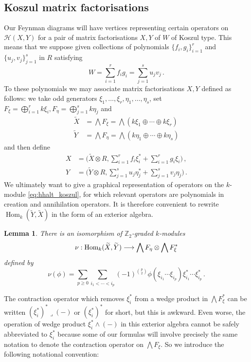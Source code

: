 \documentclass[english,letter paper,12pt,leqno]{article}
\newtheorem{lemma}[theorem]{Lemma}
\theoremstyle{example}
\numberwithin{equation}{section}
\def\HH{\HH}
\def\HH{\mathcal{H}}
\def\Hom{\operatorname{Hom}}
\def\nZ{\mathds{Z}}
\begin{document}
\subsection{Koszul matrix factorisations}\label{section:koszul_mf}

Our Feynman diagrams will have vertices representing certain operators on $\HH(X,Y)$ for a pair of matrix factorisations $X,Y$ of $W$ of Koszul type. This means that we suppose given collections of polynomials $\{ f_i, g_i \}_{i=1}^r$ and $\{ u_j, v_j \}_{j=1}^s$ in $R$ satisfying
\[
W = \sum_{i=1}^r f_i g_i = \sum_{j=1}^s u_j v_j\,.
\]
To these polynomials we may associate matrix factorisations $X,Y$ defined as follows: we take odd generators $\xi_1,\ldots,\xi_r,\eta_1,\ldots,\eta_s$, set $F_\xi = \bigoplus_{i=1}^r k \xi_i, F_\eta = \bigoplus_{j=1}^s k \eta_j$ and
\begin{align*}
\widetilde{X} &= \bigwedge F_\xi = \bigwedge( k \xi_1 \oplus \cdots \oplus k \xi_r )\\
\widetilde{Y} &= \bigwedge F_\eta = \bigwedge( k \eta_1 \oplus \cdots \oplus k \eta_s )
\end{align*}
and then define
\begin{align}
X &= \big( \widetilde{X} \otimes R, \sum_{i=1}^r f_i \xi_i^* + \sum_{i=1}^r g_i \xi_i \big)\,,\label{eq:defn_X_tilde}\\
Y &= \big( \widetilde{Y} \otimes R, \sum_{j=1}^s u_j \eta_j^* + \sum_{j=1}^s v_j \eta_j \big)\,.\label{eq:defn_Y_tilde}
\end{align}
We ultimately want to give a graphical representation of operators on the $k$-module \eqref{eq:hhalt_koszul}, for which relevant operators are polynomials in creation and annihilation operators. It is therefore convenient to rewrite $\Hom_k( \widetilde{Y}, \widetilde{X} )$ in the form of an exterior algebra.

\begin{lemma}\label{lemma:iso_nu} There is an isomorphism of $\nZ_2$-graded $k$-modules
\[
\nu: \Hom_k( \widetilde{X}, \widetilde{Y} ) \lto \bigwedge F_\eta \otimes \bigwedge F_\xi^* 
\]
defined by
\[
\nu( \phi ) = \sum_{p \ge 0} \sum_{i_1 < \cdots < i_p} (-1)^{\binom{p}{2}} \phi( \xi_{i_1} \cdots \xi_{i_p} ) \xi_{i_1}^* \cdots \xi_{i_p}^*\,.
\]
\end{lemma}

The contraction operator which removes $\xi^*_i$ from a wedge product in $\bigwedge F_\xi^*$ can be written $(\xi_i^*)^* \lrcorner (-)$ or $(\xi_i^*)^*$ for short, but this is awkward. Even worse, the operation of wedge product $\xi_i^* \wedge (-)$ in this exterior algebra cannot be safely abbreviated to $\xi_i^*$ because some of our formulas will involve precisely the same notation to denote the contraction operator on $\bigwedge F_\xi$. So we introduce the following notational convention:
\end{document}
